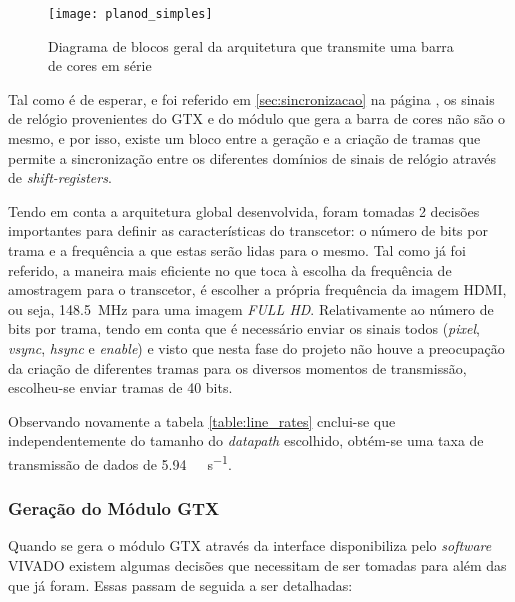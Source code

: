 \begin{figure}[h!]
	\begin{center}
		\leavevmode
		\texttt{[image: planod\_simples]}
		\captionsetup{width=1.0\linewidth}
		\caption[Diagrama de blocos geral da arquitetura que transmite uma barra de cores em série]{Diagrama de blocos geral da arquitetura que transmite uma barra de cores em série}
		\label{fig:planD_SIMPLES}
	\end{center}
\end{figure}

Tal como é de esperar, e foi referido em \ref{sec:sincronizacao} na página \pageref{sec:sincronizacao}, os sinais de relógio provenientes do GTX e do módulo que gera a barra de cores não são o mesmo, e por isso, existe um bloco entre a geração e a criação de tramas que permite a sincronização entre os diferentes domínios de sinais de relógio através de \textit{shift-registers}.

Tendo em conta a arquitetura global desenvolvida, foram tomadas 2 decisões importantes para definir as características do transcetor: o número de bits por trama e a frequência a que estas serão lidas para o mesmo. Tal como já foi referido, a maneira mais eficiente no que toca à escolha da frequência de amostragem para o transcetor, é escolher a própria frequência da imagem HDMI, ou seja, \SI{148.5}{\mega\hertz} para uma imagem \textit{FULL HD}. Relativamente ao número de bits por trama, tendo em conta que é necessário enviar os sinais todos (\textit{pixel}, \textit{vsync}, \textit{hsync} e \textit{enable}) e visto que nesta fase do projeto não houve a preocupação da criação de diferentes tramas para os diversos momentos de transmissão, escolheu-se enviar tramas de 40 bits.

Observando novamente a tabela \ref{table:line_rates} cnclui-se que independentemente do tamanho do \textit{datapath} escolhido, obtém-se uma taxa de transmissão de dados de \SI{5.94}{\giga\bit\per\second}.

\subsubsection{Geração do Módulo GTX} \label{subsub:GTX_generate}

Quando se gera o módulo GTX através da interface disponibiliza pelo \textit{software} VIVADO existem algumas decisões que necessitam de ser tomadas para além das que já foram. Essas passam de seguida a ser detalhadas:

